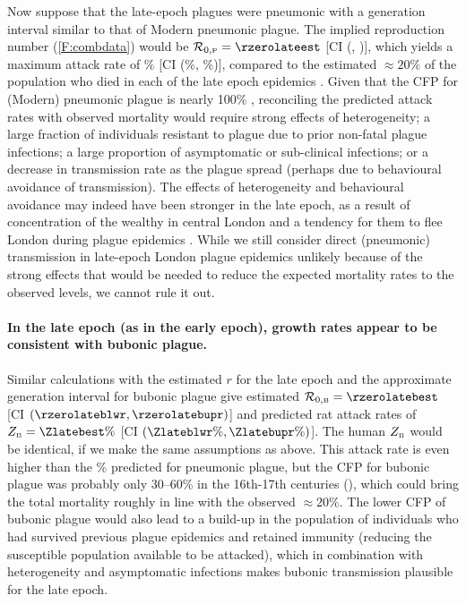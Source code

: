 Now suppose that the late-epoch plagues were pneumonic with a generation interval similar to that of Modern pneumonic plague.  The implied reproduction number (\cref{F:combdata}) would be $\rzerop=\rzerolateest$ [CI (\rzerolatelwr, \rzerolateupr)],
which yields a maximum attack rate of \Zlateest\%  [CI (\Zlatelwr\%, \Zlateupr\%)], compared to 
the estimated $\approx 20\%$ of the population
who died in each of the late epoch epidemics \cite[p.\,4]{Cumm+16}.
Given that the CFP for (Modern) pneumonic plague is nearly 100\%
\cite{KoolWein05,WHOplaguePage,WHOplagueFactSheet,CDCplagueEmergencyFAQ},
reconciling the predicted attack rates with observed mortality would require strong effects of heterogeneity; a large fraction of individuals resistant to plague due to prior non-fatal plague infections; a large proportion of asymptomatic or sub-clinical infections; or a decrease in transmission rate as the plague spread (perhaps due to behavioural avoidance of transmission).
The effects of heterogeneity and behavioural avoidance may indeed have been stronger in the late epoch, as a result of concentration of the wealthy in central London and a tendency for them to flee London during plague epidemics \cite[p.\,4]{Cumm+16}. While we still consider direct (pneumonic) transmission in  late-epoch London plague epidemics unlikely because of the strong effects that would be needed to reduce the expected mortality rates to the observed levels, we cannot rule it out.

\paragraph{In the late epoch (as in the early epoch), growth rates appear to be consistent with bubonic plague.}

Similar calculations with the estimated $r$ for the late epoch and the
approximate generation interval for bubonic plague give estimated $\rzerob=\rzerolatebest$ [CI $(\rzerolateblwr, \rzerolatebupr)$] and predicted rat attack rates of $\Zb=\Zlatebest\%$ [CI $(\Zlateblwr\%, \Zlatebupr\%)$]. The human $Z_{\mbox{\tiny B}}$ would be identical, if we make the same assumptions as above. This attack rate is even higher than the \Zlateest\% predicted for pneumonic plague, but the CFP for bubonic plague was probably only 30--60\% in the 16th-17th centuries (\eg \cite{Ligo06,WHOplagueFactSheet}), which could bring the total mortality roughly in line with the observed $\approx 20\%$. The lower CFP of bubonic plague would also lead to a build-up in the population of individuals who had survived previous plague epidemics and retained immunity (reducing the susceptible population available to be attacked), which in combination with heterogeneity and asymptomatic infections makes bubonic transmission plausible for the late epoch.

